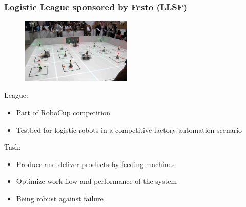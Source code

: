 \documentclass[]{beamer}
\begin{document}
\begin{frame}
  \frametitle{Logistic League sponsored by Festo (LLSF)}
  \fboxsep=0pt
  \noindent
  \begin{minipage}[]{0.48\linewidth}
    \begin{figure}
      \includegraphics[width=150pt,heigth=120pt]{../pics/llsfLeague.png}\\
    \end{figure}
  \end{minipage}
  \hfill
  \begin{minipage}[]{0.48\linewidth}
    League:
    \begin{itemize}
    \item Part of RoboCup competition
    \item Testbed for logistic robots in a competitive factory automation scenario
    \end{itemize}
    \pause
    Task:
    \begin{itemize}
    \item Produce and deliver products by feeding machines%
    \item Optimize work-flow and performance of the system
    \item Being robust against failure
    \end{itemize}
  \end{minipage}
\end{frame}
\end{document}
